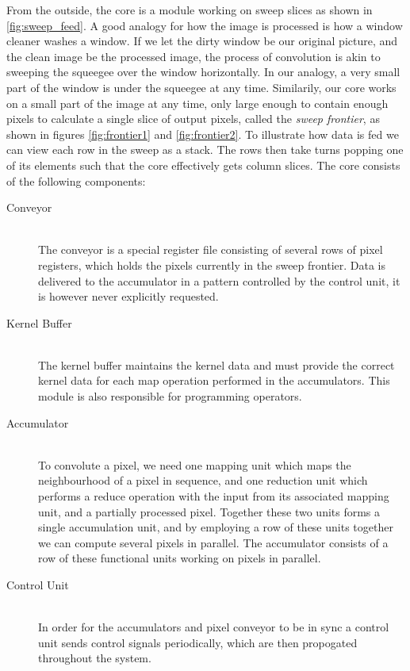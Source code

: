 From the outside, the core is a module working on sweep slices as shown in \ref{fig:sweep_feed}.
A good analogy for how the image is processed is how a window cleaner washes a window.
If we let the dirty window be our original picture, and the clean image be the processed image, the process of convolution is akin to sweeping the squeegee over the window horizontally.
In our analogy, a very small part of the window is under the squeegee at any time.
Similarily, our core works on a small part of the image at any time, only large enough to contain enough pixels to calculate a single slice of output pixels, called the \textit{sweep frontier}, as shown in figures \ref{fig:frontier1} and \ref{fig:frontier2}.
To illustrate how data is fed we can view each row in the sweep as a stack.
The rows then take turns popping one of its elements such that the core effectively gets column slices.
The core consists of the following components:

\begin{description}
    \item[Conveyor] \hfill\\ 
        The conveyor is a special register file consisting of several rows of pixel registers, which holds the pixels currently in the sweep frontier.
        Data is delivered to the accumulator in a pattern controlled by the control unit, it is however never explicitly requested.
    \item[Kernel Buffer] \hfill\\
        The kernel buffer maintains the kernel data and must provide the correct kernel data for each map operation performed in the accumulators.
        This module is also responsible for programming operators.
    \item[Accumulator] \hfill\\
        To convolute a pixel, we need one mapping unit which maps the neighbourhood of a pixel in sequence, and one reduction unit which performs a reduce operation with the input from its associated mapping unit, and a partially processed pixel.
        Together these two units forms a single accumulation unit, and by employing a row of these units together we can compute several pixels in parallel.
        The accumulator consists of a row of these functional units working on pixels in parallel.
    \item[Control Unit] \hfill\\
        In order for the accumulators and pixel conveyor to be in sync a control unit sends control signals periodically, which are then propogated throughout the system.
\end{description}

